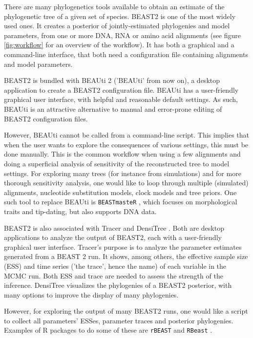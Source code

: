 \documentclass{article}
\begin{document}
There are many phylogenetics tools available to obtain an estimate 
of the phylogenetic tree of a given set of species. 
BEAST2 \cite{bouckaert2014beast} is one of the most widely used ones. 
It creates a posterior of jointly-estimated phylogenies and model parameters, 
from one or more DNA, RNA or amino acid alignments (see figure \ref{fig:workflow} 
for an overview of the workflow). 
It has both a graphical and a command-line interface, 
that both need a configuration file containing 
alignments and model parameters.

BEAST2 is bundled with BEAUti 2 \cite{drummond2012bayesian} ('BEAUti' from now on), 
a desktop application to create a BEAST2 configuration file.
BEAUti has a user-friendly graphical user interface, with helpful and 
reasonable default settings.
As such, BEAUti is an attractive alternative 
to manual and error-prone editing of BEAST2 configuration files. 

However, BEAUti cannot be called from a command-line script.
This implies that when the user 
wants to explore the consequences of various settings, this must be done manually.
This is the common workflow when using a few alignments and doing a superficial 
analysis of sensitivity of the reconstructed tree to model settings. 
For exploring many trees (for instance from simulations) and for
more thorough sensitivity analysis, one would like to loop through 
multiple (simulated) alignments, nucleotide substitution models, 
clock models and tree priors. 
One such tool to replace 
BEAUti is \verb;BEASTmasteR; \cite{beastmaster},
which focuses on morphological traits and tip-dating, but also 
supports DNA data. 

BEAST2 is also associated with Tracer \cite{tracer} and 
DensiTree \cite{DensiTree}. Both are desktop applications 
to analyze the output of BEAST2, each with a user-friendly graphical user interface. 
Tracer's purpose is to analyze the parameter estimates generated
from a BEAST 2 run. It shows, among
others, the effective sample size (ESS) and time series ('the trace', 
hence the name) of each variable in the MCMC run. Both ESS and trace
are needed to assess the strength of the inference. 
DensiTree visualizes the phylogenies of a BEAST2 posterior, with
many options to improve the display of many phylogenies.

However, for exploring the output of many BEAST2 runs, 
one would like a script to collect all parameters' ESSes,
parameter traces and posterior phylogenies. 
Examples of R packages to do some of these
are \verb;rBEAST; \cite{rBEAST_ratmann} and 
\verb;RBeast; \cite{RBeast_faria}. 
\end{document}
